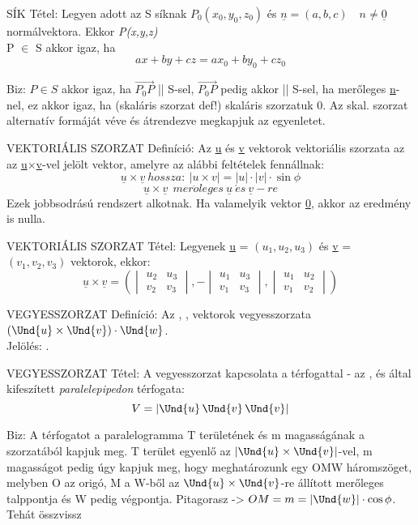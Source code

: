 \begin{framed}
SÍK Tétel: Legyen adott az S síknak $P_0(x_0,y_0,z_0)$ és $\underline{n} = (a,b,c)\quad n\neq \underline{0}$ normálvektora. Ekkor \textit{P(x,y,z)}\\ P $\in$ S akkor igaz, ha
$$ax+by+cz=ax_0+by_0+cz_0$$
\end{framed}
\begin{leftbar}
Biz: $P \in S$ akkor igaz, ha $\vec{P_0P}$ || S-sel, $\vec{P_0P}$ pedig akkor || S-sel, ha merőleges \underline{n}-nel, ez akkor igaz, ha (skaláris szorzat def!) skaláris szorzatuk 0. Az skal. szorzat alternatív formáját véve és átrendezve megkapjuk az egyenletet.
\end{leftbar}
\begin{shaded}
VEKTORIÁLIS SZORZAT Definíció: Az \underline{u} és \underline{v} vektorok vektoriális szorzata az az \underline{u}×\underline{v}-vel jelölt
vektor, amelyre az alábbi feltételek fennállnak:
$$\underline{u} \times \underline{v}\: hossza:\: |u \times v| = |u| \cdot |v| \cdot\sin\phi$$
$$\underline{u} \times \underline{v}\ \: mer\ddot{o}leges\: \underline{u}\: \acute{e}s\: \underline{v}-re$$
Ezek jobbsodrású rendszert alkotnak. Ha valamelyik vektor \underline{0}, akkor az eredmény is nulla.
\end{shaded}
\begin{framed}
VEKTORIÁLIS SZORZAT Tétel: Legyenek \underline{u} = $(u_1,u_2,u_3)$ és \underline{v} = $(v_1,v_2,v_3)$ vektorok, ekkor:
$$\underline{u}\times\underline{v} = \left( \begin{vmatrix}
u_2&u_3\\v_2&v_3\end{vmatrix},-\begin{vmatrix}
u_1&u_3\\v_1&v_3\end{vmatrix},\begin{vmatrix}
u_1&u_2\\v_1&v_2\end{vmatrix} \right)$$
\end{framed}
\begin{shaded}
VEGYESSZORZAT Definíció: Az , ,   vektorok vegyesszorzata $(\Und{u}\times\Und{v})\cdot\Und{w}$.\\Jelölés:   .
\end{shaded}
\begin{framed}
VEGYESSZORZAT Tétel: A vegyesszorzat kapcsolata a térfogattal - az ,  és  által kifeszített \textit{paralelepipedon} térfogata:
$$V = |\Und{u}\, \Und{v}\, \Und{v}|$$
\end{framed}
\begin{leftbar}
Biz: A térfogatot a paralelogramma T területének és m magasságának a szorzatából kapjuk meg. T terület egyenlő az $|\Und{u}\times\Und{v}|$-vel, m magasságot pedig úgy kapjuk meg, hogy meghatározunk egy OMW háromszöget, melyben O az origó, M a W-ből az $\Und{u}\times\Und{v}$-re állított merőleges talppontja és W pedig  végpontja. Pitagorasz -> $OM = m = |\Und{w}| \cdot \cos\phi$. Tehát összvissz
\end{leftbar}

